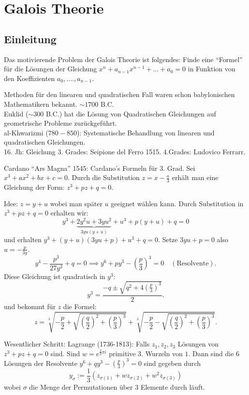 \graphicspath{{Images/}}

\chapter{Galois Theorie}

\section{Einleitung}
Das motivierende Problem der Galois Theorie ist folgendes:
Finde eine \enquote{Formel} für die Lösungen der Gleichung
$x^{n} + a_{n-1} x^{n-1} + \ldots + a_0 = 0$ in Funktion von den Koeffizienten $a_0,\ldots.,a_{n-1}$.

Methoden für den linearen und quadratischen Fall waren schon babylonischen Mathematikern bekannt.  $\sim 1700$ B.C.\\
Euklid ($\sim 300$ B.C.) hat die Lösung von Quadratischen Gleichungen auf geometrische Probleme zurückgeführt.\\
al-Khwarizmi ($780 - 850$): Systematische Behandlung von linearen und quadratischen Gleichungen.\\
16. Jh: Gleichung 3. Grades: Seipione del Ferro 1515. 4.Grades: Ludovico Ferrarr.

Cardano \enquote{Ars Magna} 1545: Cardano's Formeln für  3. Grad.
Sei $x^{3} + a x^{2} + bx + c = 0$. Durch die Substitution $z = x - \frac{a}{3}$ erhält man eine Gleichung der Form:
$z^3 + p z + q = 0$.

Idee: $z = y + u$ wobei man später  $u$ geeignet wählen kann. Durch Substitution in $z^3 + pz + q = 0$ erhalten wir:
\[
	y^3 + \underbrace{2y^2 u + 3yu^2}_{3yu (y+u)} + u^3 + p(y+u) + q = 0
\] 
und erhalten $y^3 + (y+u)(3yu + p) + u^3 + q = 0$.
Setze $3yu +p = 0$ also $u = -\frac{p}{3y}$.
\[
	y^{4} - \frac{p^3}{27 y^3} + q = 0 \implies y^{6} + p y^3 - (\frac{p}{3})^3 = 0 \quad (\text{Resolvente})
.\] 
Diese Gleichung ist quadratisch in $y^3$:
\[
	y^3 = \frac{-q \pm \sqrt{q^2 + 4 (\frac{p}{3})^3} }{2}
.\] 
und bekommt für $z$ die Formel:
\[
	z = \sqrt[3]{-\frac{p}{2} + \sqrt{\left(\frac{q}{2}\right)^2 + \left(\frac{p}{3}\right)^3}} + \sqrt[3]{-\frac{p}{2} - \sqrt{\left(\frac{q}{2}\right)^2 + \left(\frac{p}{3}\right)^3}} 
.\] 

Wesentlicher Schritt: Lagrange (1736-1813): Falls $z_1, z_2, z_3$ Lösungen von $z^3 + pz + q = 0$ sind.
Sind $w = e^{\frac{2}{3}\pi i }$ primitive 3. Wurzeln von $1$. Dann sind die $6$ Lösungen der Resolvente
$y^6 + q y^3 - \left( \frac{p}{3} \right)^3 = 0$ sind gegeben durch
\[
	y_{\sigma} := \frac{1}{3}\left( z_{\sigma(1)} + w z_{\sigma(2)} + w^2 z_{\sigma(3)} \right) 
\] 
wobei $\sigma$ die Menge der Permutationen über $3$ Elemente durch läuft.

